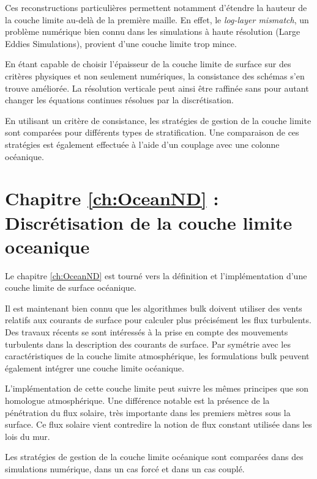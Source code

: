 Ces reconstructions particulières permettent notamment
	d'étendre la hauteur de la couche limite au-delà
	de la première maille.
	En effet, le \textit{log-layer mismatch},
	un problème numérique bien connu dans les
	simulations à haute résolution (Large Eddies
	Simulations),
	provient d'une couche limite trop mince.
\par
En étant capable de choisir l'épaisseur de la couche
	limite de surface sur des critères physiques et non
	seulement numériques, la consistance des schémas
	s'en trouve améliorée. La résolution verticale
	peut ainsi être raffinée sans pour autant changer
	les équations continues résolues par la
			discrétisation.
\par
En utilisant un critère de consistance, les stratégies
	de gestion de la couche limite sont
	comparées pour différents types de stratification.
	Une comparaison de ces stratégies est également effectuée
	à l'aide d'un couplage avec une colonne océanique.
\section*{Chapitre \ref{ch:OceanND} : Discrétisation de
la couche limite oceanique}
Le chapitre \ref{ch:OceanND} est tourné vers la définition et l'implémentation
d'une couche limite de surface océanique.
\par
Il est maintenant bien connu que les algorithmes
	bulk doivent utiliser des vents relatifs aux
	courants de surface pour calculer plus précisément
	les flux turbulents.
	Des travaux récents \citep{pelletier_two-sided_2021}
	se sont intéressés à la prise en compte des mouvements
	turbulents dans la description des courants de
	surface. Par symétrie avec les caractéristiques
	de la couche limite atmosphérique, les formulations
	bulk peuvent également intégrer une couche
	limite océanique.
\par
L'implémentation de cette couche limite peut suivre
	les mêmes principes que son homologue atmosphérique.
	Une différence notable est la présence de la
	pénétration du flux solaire, très importante dans
	les premiers mètres sous la surface.
	Ce flux solaire vient contredire la notion de flux
	constant utilisée dans les lois du mur.
\par
Les stratégies de gestion de la couche limite
	océanique sont comparées dans des simulations numérique,
	dans un cas forcé et dans un cas couplé.
